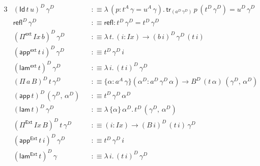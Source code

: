 \documentclass[12pt,a4paper,twoside,openany]{book}
\theoremstyle{remark}
\theoremstyle{definition}
\theoremstyle{theorem}
\newcommand{\mi}[1]{\mathit{#1}}
\newcommand{\ms}[1]{\mathsf{#1}}
\newcommand{\tr}{\ms{tr}}
\newcommand{\refl}{\mathsf{refl}}
\newcommand{\Id}{\mathsf{Id}}
\newcommand{\Pie}{\Pi^{\mathsf{Ext}}}
\newcommand{\appe}{\mathsf{app^{Ext}}}
\newcommand{\lame}{\mathsf{lam^{Ext}}}
\newcommand{\Piinf}{\Pi^{\mathsf{ext}}}
\newcommand{\appinf}{\mathsf{app^{ext}}}
\newcommand{\laminf}{\mathsf{lam^{ext}}}
\newcommand{\app}{\ms{app}}
\newcommand{\lam}{\ms{lam}}
\newcommand{\defn}{:\equiv}
\begin{document}
\begin{alignat*}{3}
  &(\Id\,t\,u)^D\,\gamma^D &&\defn \lambda\,(p : t^A\,\gamma = u^A\,\gamma).\,\tr_{(a^D\,\gamma^D)}\,p\,(t^D\,\gamma^D) = u^D\,\gamma^D\\
  &\refl^D\,\gamma^D &&\defn \refl : t^D\,\gamma^D = t^D\,\gamma^D\\
  &(\Piinf\,\mi{Ix}\,b)^D\,\gamma^D &&\defn \lambda\,t.\,(i : \mi{Ix}) \to (b\,i)^D\,\gamma^D\,(t\,i)\\
  &(\appinf\,t\,i)^D\,\gamma^D &&\defn t^D\,\gamma^D\,i\\
  &(\laminf\,t)^D\,\gamma^D &&\defn \lambda\,i.\,(t\,i)^D\,\gamma^D\\
  &(\Pi\,a\,B)^D\,t\,\gamma^D &&\defn \{\alpha : a^A\,\gamma\}(\alpha^D : a^D\,\gamma^D\,\alpha)
    \to B^D\,(t\,\alpha)\,(\gamma^D,\,\alpha^D)\\
  &(\app\,t)^D\,(\gamma^D,\,\alpha^D) &&\defn t^D\,\gamma^D\,\alpha^D\\
  &(\lam\,t)^D\,\gamma^D &&\defn \lambda\,\{\alpha\}\,\alpha^D.\,t^D\,(\gamma^D,\,\alpha^D)\\
  &(\Pie\,\mi{Ix}\,B)^D\,t\,\gamma^D &&\defn (i : \mi{Ix}) \to (B\,i)^D\,(t\,i)\,\gamma^D\\
  &(\appe\,t\,i)^D\,\gamma^D &&\defn t^D\,\gamma^D\,i\\
  &(\lame\,t)^D\,\gamma &&\defn \lambda\,i.\,(t\,i)^D\,\gamma^D
\end{alignat*}
\end{document}
